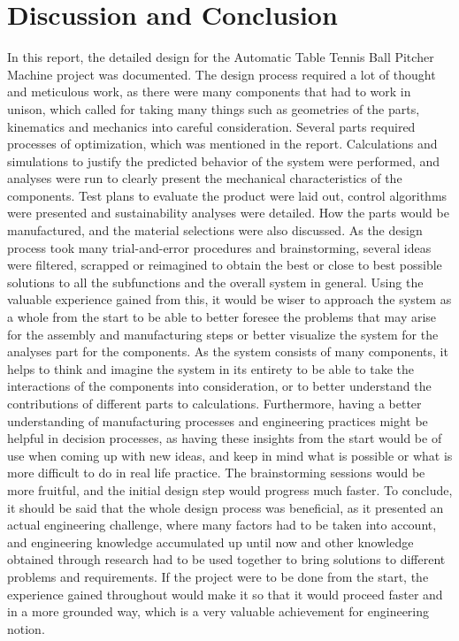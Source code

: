 \documentclass[12pt]{report}
\begin{document}
\section{Discussion and Conclusion}
In this report, the detailed design for the Automatic Table Tennis Ball Pitcher Machine project was documented. The design process required a lot of thought and meticulous work, as there were many components that had to work in unison, which called for taking many things such as geometries of the parts, kinematics and mechanics into careful consideration. Several parts required processes of optimization, which was mentioned in the report. Calculations and simulations to justify the predicted behavior of the system were performed, and analyses were run to clearly present the mechanical characteristics of the components. Test plans to evaluate the product were laid out, control algorithms were presented and sustainability analyses were detailed. How the parts would be manufactured, and the material selections were also discussed.
As the design process took many trial-and-error procedures and brainstorming, several ideas were filtered, scrapped or reimagined to obtain the best or close to best possible solutions to all the subfunctions and the overall system in general. Using the valuable experience gained from this, it would be wiser to approach the system as a whole from the start to be able to better foresee the problems that may arise for the assembly and manufacturing steps or better visualize the system for the analyses part for the components. As the system consists of many components, it helps to think and imagine the system in its entirety to be able to take the interactions of the components into consideration, or to better understand the contributions of different parts to calculations. Furthermore, having a better understanding of manufacturing processes and engineering practices might be helpful in decision processes, as having these insights from the start would be of use when coming up with new ideas, and keep in mind what is possible or what is more difficult to do in real life practice. The brainstorming sessions would be more fruitful, and the initial design step would progress much faster.
To conclude, it should be said that the whole design process was beneficial, as it presented an actual engineering challenge, where many factors had to be taken into account, and engineering knowledge accumulated up until now and other knowledge obtained through research had to be used together to bring solutions to different problems and requirements. If the project were to be done from the start, the experience gained throughout would make it so that it would proceed faster and in a more grounded way, which is a very valuable achievement for engineering notion.
\end{document}
